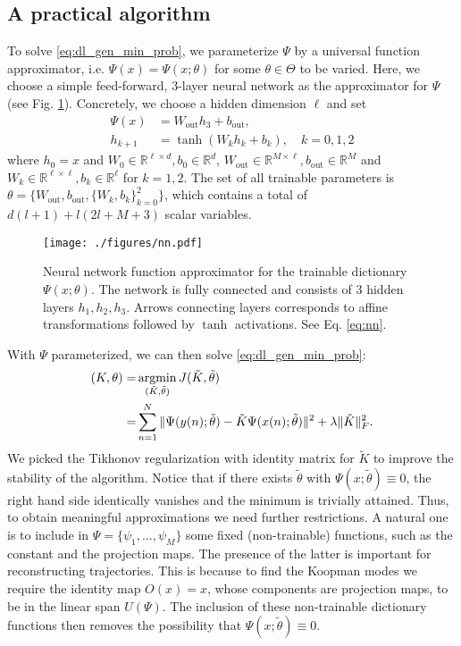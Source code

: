 \documentclass[%
 aip,
 cha,
 sd,%
 amsmath,amssymb,
 preprint,%
]{revtex4-1}
\begin{document}
\subsection{A practical algorithm}
To solve \eqref{eq:dl_gen_min_prob}, we parameterize $\Psi$ by a universal function approximator, i.e. $\Psi(x) = \Psi(x;\theta)$ for some $\theta\in \Theta$ to be varied. Here, we choose a simple feed-forward, 3-layer neural network as the approximator for $\Psi$ (see Fig. \ref{fig:nn}). Concretely, we choose a hidden dimension $\ell$ and set
\begin{align}
	\Psi(x) &= W_{\text{out}}h_3 + b_{\text{out}}, \nonumber\\
	h_{k+1} &= \tanh(W_{k}h_{k} + b_k), \quad k=0,1,2
	\label{eq:nn}
\end{align}
where $h_0 = x$ and $W_{0}\in\mathbb{R}^{\ell\times d}, b_{0}\in\mathbb{R}^{d}$, $W_{\text{out}}\in\mathbb{R}^{M\times \ell}, b_{\text{out}}\in\mathbb{R}^M$ and $W_{k}\in\mathbb{R}^{\ell\times \ell}, b_{k}\in\mathbb{R}^{\ell}$ for $k=1,2$. The set of all trainable parameters is $\theta = \{W_{\text{out}},b_{\text{out}},\{W_k,b_k\}_{k=0}^2\}$, which contains a total of $d (l+1)+l (2 l+M+3)$ scalar variables.
\begin{figure}
	\texttt{[image: ./figures/nn.pdf]}
	\caption{Neural network function approximator for the trainable dictionary $\Psi(x;\theta)$. The network is fully connected and consists of 3 hidden layers $h_1,h_2,h_3$. Arrows connecting layers corresponds to affine transformations followed by $\tanh$ activations. See Eq. \eqref{eq:nn}.}
	\label{fig:nn}
\end{figure}

With $\Psi$ parameterized, we can then solve \eqref{eq:dl_gen_min_prob}: 
\begin{align}
	(K, \theta) =& \operatornamewithlimits{arg min}_{(\tilde{K}, \tilde{\theta})} J(\tilde{K},\tilde{\theta}) \nonumber\\
	=& \sum_{n=1}^{N} {\Vert \Psi(y(n);\tilde{\theta}) - \tilde{K}\Psi(x(n);\tilde{\theta}) \Vert^2} + \lambda \Vert \tilde{K}\Vert^2_F.
	\label{eq:dl_min_prob}
\end{align}
We picked the Tikhonov regularization \cite{tikhonov1943stability,ng2004feature} with identity matrix for $\tilde{K}$ to improve the stability of the algorithm. 
Notice that if there exists $\tilde{\theta}$ with $\Psi(x;\tilde{\theta})\equiv0$, the right hand
side identically vanishes and the minimum is trivially attained. 
Thus, to obtain meaningful approximations we need further restrictions.
A natural one is to include in $\Psi=\{\psi_1,\dots,\psi_M\}$
some fixed (non-trainable) functions, such as the constant and the projection maps. The presence of the latter is important for reconstructing trajectories. This is because to find the Koopman modes we require the identity map $O(x)=x$, whose components are projection maps, to be in the linear span $U(\Psi)$. The inclusion of these non-trainable dictionary functions then removes the possibility that 
$\Psi(x;\tilde{\theta})\equiv0$. 
\end{document}
